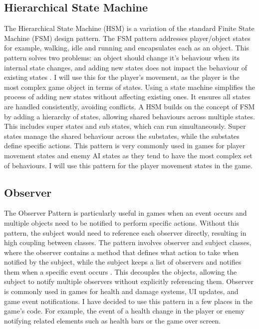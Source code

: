 \documentclass[]{final_report}
\begin{document}
\subsection{Hierarchical State Machine}\label{HSM}
The Hierarchical State Machine (HSM)  is a variation of the standard Finite State Machine (FSM) design pattern. The FSM pattern addresses player/object states for example, walking, idle and running and encapsulates each as an object. This pattern solves two problems: an object should change it’s behaviour when its internal state changes, and adding new states does not impact the behaviour of existing states \cite{unity2022_patterns}. I will use this for the player's movement, as the player is the most complex game object in terms of states. Using a state machine simplifies the process of adding new states without affecting existing ones.  It ensures all states are handled consistently, avoiding conflicts. A HSM builds on the concept of FSM by adding a hierarchy of states, allowing shared behaviours across multiple states. This includes super states and sub states, which can run simultaneously. Super states manage the shared behaviour across the substates, while the substates define specific actions. This pattern is very commonly used in games for player movement states and enemy AI states as they tend to have the most complex set of behaviours. I will use this pattern for the player movement states in the game.
\subsection{Observer}\label{observer}
The Observer Pattern is particularly useful in games when an event occurs and multiple objects need to be notified to perform specific actions. Without this pattern, the subject would need to reference each observer directly, resulting in high coupling between classes. The pattern involves observer and subject classes, where the observer contains a method that defines what action to take when notified by the subject, while the subject keeps a list of observers and notifies them when a specific event occurs \cite{nystrom2011game}. This decouples the objects, allowing the subject to notify multiple observers without explicitly referencing them. Observer is commonly used in games for health and damage systems, UI updates, and game event notifications. I have decided to use this pattern in a few places in the game's code. For example, the event of a health change in the player or enemy notifying related elements such as health bars or the game over screen.
\end{document}
